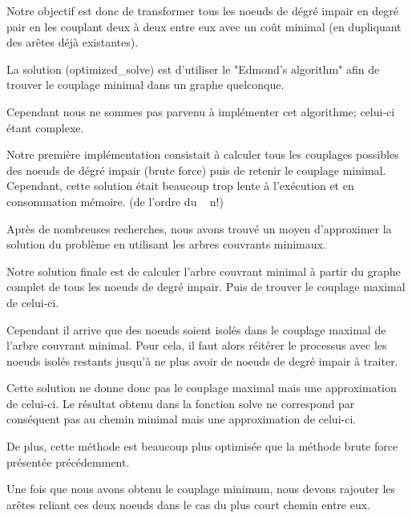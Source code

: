 \documentclass{article}
\begin{document}
\newline

Notre objectif est donc de transformer tous les noeuds de dégré impair en degré pair en les couplant deux à deux entre eux avec un coût minimal (en dupliquant des arêtes déjà existantes).

\vspace{0.3cm}

\newline

La solution (optimized\_solve) est d'utiliser le "Edmond's algorithm" afin de trouver le couplage minimal dans un graphe quelconque.

Cependant nous ne sommes pas parvenu à implémenter cet algorithme; celui-ci étant complexe.

\vspace{0.3cm}

\newline

Notre première implémentation consistait à calculer tous les couplages possibles des noeuds de dégré impair (brute force) puis de retenir le couplage minimal. Cependant, cette solution était beaucoup trop lente à l'exécution et en consommation mémoire. (de l'ordre du ~ n!)

\vspace{0.3cm}

\newline

Après de nombreuses recherches, nous avons trouvé un moyen d'approximer la solution du problème en utilisant les arbres couvrants minimaux.

Notre solution finale est de calculer l'arbre couvrant minimal à partir du graphe complet de tous les noeuds de degré impair. Puis de trouver le couplage maximal de celui-ci.

Cependant il arrive que des noeuds soient isolés dans le couplage maximal de l'arbre couvrant minimal. Pour cela, il faut alors réitérer le processus avec les noeuds isolés restants jusqu'à ne plus avoir de noeuds de degré impair à traiter.

Cette solution ne donne donc pas le couplage maximal mais une approximation de celui-ci. Le résultat obtenu dans la fonction solve ne correspond par conséquent pas au chemin minimal mais une approximation de celui-ci.

De plus, cette méthode est beaucoup plus optimisée que la méthode brute force présentée précédemment. 

Une fois que nous avons obtenu le couplage minimum, nous devons rajouter les arêtes reliant ces deux noeuds dans le cas du plus court chemin entre eux. 
\end{document}
